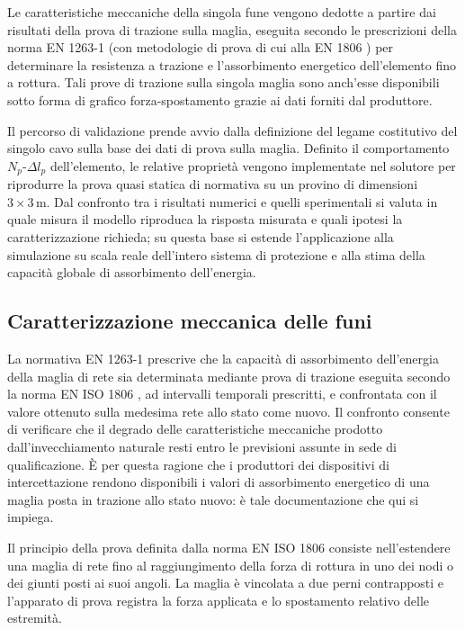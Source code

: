 Le caratteristiche meccaniche della singola fune vengono dedotte a partire dai risultati della prova di trazione sulla maglia, eseguita secondo le prescrizioni della norma EN 1263-1 \cite{EN1263-1} (con metodologie di prova di cui alla EN 1806 \cite{ENISO1806-2002}) per determinare la resistenza a trazione e l'assorbimento energetico dell'elemento fino a rottura. Tali prove di trazione sulla singola maglia sono anch'esse disponibili sotto forma di grafico forza-spostamento grazie ai dati forniti dal produttore.

Il percorso di validazione prende avvio dalla definizione del legame costitutivo del singolo cavo sulla base dei dati di prova sulla maglia. Definito il comportamento $N_p$-$\Delta l_p$ dell'elemento, le relative proprietà vengono implementate nel solutore per riprodurre la prova quasi statica di normativa su un provino di dimensioni $3\times3 \, \text{m}$. Dal confronto tra i risultati numerici e quelli sperimentali si valuta in quale misura il modello riproduca la risposta misurata e quali ipotesi la caratterizzazione richieda; su questa base si estende l'applicazione alla simulazione su scala reale dell'intero sistema di protezione e alla stima della capacità globale di assorbimento dell'energia.

\subsection{Caratterizzazione meccanica delle funi}
\label{sec:caratterizzazione_funi}

La normativa EN 1263-1 \cite{EN1263-1} prescrive che la capacità di assorbimento dell'energia della maglia di rete sia determinata mediante prova di trazione eseguita secondo la norma EN ISO 1806 \cite{ENISO1806-2002}, ad intervalli temporali prescritti, e confrontata con il valore ottenuto sulla medesima rete allo stato come nuovo. Il confronto consente di verificare che il degrado delle caratteristiche meccaniche prodotto dall'invecchiamento naturale resti entro le previsioni assunte in sede di qualificazione. È per questa ragione che i produttori dei dispositivi di intercettazione rendono disponibili i valori di assorbimento energetico di una maglia posta in trazione allo stato nuovo: è tale documentazione che qui si impiega.

Il principio della prova definita dalla norma EN ISO 1806 \cite{ENISO1806-2002} consiste nell'estendere una maglia di rete fino al raggiungimento della forza di rottura in uno dei nodi o dei giunti posti ai suoi angoli. La maglia è vincolata a due perni contrapposti e l'apparato di prova registra la forza applicata e lo spostamento relativo delle estremità.

